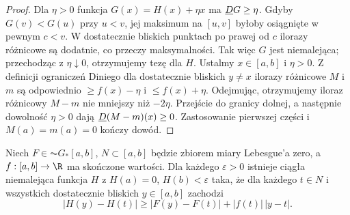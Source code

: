 \begin{proof}
Dla $\eta>0$ funkcja $G(x)=H(x)+\eta x$ ma $\underline D G\ge\eta$. Gdyby $G(v)<G(u)$ przy $u<v$, jej maksimum na $[u,v]$ byłoby osiągnięte w pewnym $c<v$. W dostatecznie bliskich punktach po prawej od $c$ ilorazy różnicowe są dodatnie, co przeczy maksymalności. Tak więc $G$ jest niemalejąca; przechodząc z $\eta\downarrow0$, otrzymujemy tezę dla $H$. Ustalmy $x\in[a,b]$ i $\eta>0$. Z definicji ograniczeń Diniego dla dostatecznie bliskich $y\ne x$ ilorazy różnicowe $M$ i $m$ są odpowiednio $\ge f(x)-\eta$ i $\le f(x)+\eta$. Odejmując, otrzymujemy iloraz różnicowy $M-m$ nie mniejszy niż $-2\eta$. Przejście do granicy dolnej, a następnie dowolność $\eta>0$ dają $\underline D(M-m)(x)\ge0$. Zastosowanie pierwszej części i $M(a)=m(a)=0$ kończy dowód.
\end{proof}
\begin{lemat}\label{it:lem:perron-null-correction}
Niech $F\in\AC G_*[a,b]$, $N\subset[a,b]$ będzie zbiorem
miary Lebesgue'a zero, a $f:[a,b]\to\R$ ma skończone wartości.
Dla każdego $\varepsilon>0$ istnieje ciągła niemalejąca funkcja
$H$ z $H(a)=0$, $H(b)<\varepsilon$ taka, że dla każdego $t\in N$
i wszystkich dostatecznie bliskich $y\in[a,b]$ zachodzi
\[
 |H(y)-H(t)|\ge |F(y)-F(t)|+|f(t)|\,|y-t|.
\]
\end{lemat}
